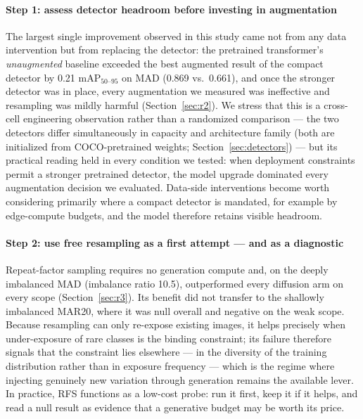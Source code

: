 \documentclass[preprint,12pt,authoryear]{elsarticle}
\newcommand{\mapm}{mAP\(_{50\text{--}95}\)}
\begin{document}
\paragraph{Step 1: assess detector headroom before investing in
augmentation}
The largest single improvement observed in this study came not from any
data intervention but from replacing the detector: the pretrained
transformer's \emph{unaugmented} baseline exceeded the best augmented
result of the compact detector by 0.21 \mapm{} on MAD (0.869 vs.\
0.661), and once the stronger detector was in place, every augmentation
we measured was ineffective and resampling was mildly harmful
(Section~\ref{sec:r2}). We stress that this is a cross-cell engineering
observation rather than a randomized comparison --- the two detectors
differ simultaneously in capacity and architecture family (both are
initialized from COCO-pretrained weights;
Section~\ref{sec:detectors}) --- but its practical reading held in every
condition we tested: when deployment constraints permit a stronger
pretrained detector, the model upgrade dominated every augmentation
decision we evaluated. Data-side interventions become worth considering
primarily where a compact detector is mandated, for example by
edge-compute budgets, and the model therefore retains visible headroom.

\paragraph{Step 2: use free resampling as a first attempt --- and as a
diagnostic}
Repeat-factor sampling requires no generation compute and, on the deeply
imbalanced MAD (imbalance ratio 10.5), outperformed every diffusion arm
on every scope (Section~\ref{sec:r3}). Its benefit did not transfer to
the shallowly imbalanced MAR20, where it was null overall and negative
on the weak scope. Because resampling can only re-expose existing
images, it helps precisely when under-exposure of rare classes is the
binding constraint; its failure therefore signals that the constraint
lies elsewhere --- in the diversity of the training distribution rather
than in exposure frequency --- which is the regime where injecting
genuinely new variation through generation remains the available lever.
In practice, RFS functions as a low-cost probe: run it first, keep it if
it helps, and read a null result as evidence that a generative budget
may be worth its price.
\end{document}
